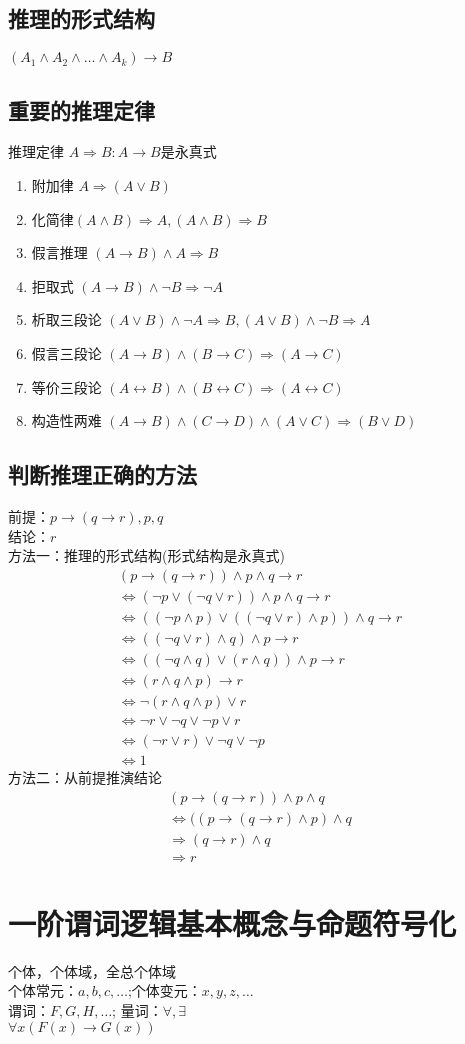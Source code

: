 \documentclass{book}
\newcommand{\Eqv}{\Leftrightarrow}
\newcommand{\eqv}{\leftrightarrow}
\newcommand{\To}{\Rightarrow}
\newcommand{\A}{\forall}
\newcommand{\E}{\exists}
\begin{document}
\subsection{推理的形式结构}
$(A_1\land A_2\land\dots\land A_k)\to B$
\subsection{重要的推理定律}
推理定律 $A\To B:A\to B$是永真式
\begin{enumerate}
\item 附加律 $A\To (A\lor B)$
\item 化简律$(A\land B)\To A, (A\land B)\To B$
\item 假言推理 $(A\to B)\land A\To B$
\item 拒取式 $(A\to B)\land \neg B\To \neg A$
\item 析取三段论 $(A\lor B)\land \neg A\To B, (A\lor B)\land \neg B\To A$
\item 假言三段论 $(A\to B)\land (B\to C)\To (A\to C)$
\item 等价三段论 $(A\eqv B)\land (B\eqv C)\To (A\eqv C)$
\item 构造性两难 $(A\to B)\land (C\to D)\land (A\lor C)\To (B\lor D)$
\end{enumerate}
\subsection{判断推理正确的方法}
前提：$p\to (q\to r), p, q$\\
结论：$r$\\
方法一：推理的形式结构(形式结构是永真式)\\
\begin{align*}
(p\to (q\to r))\land p \land q\to r\\
\Eqv (\neg p\lor (\neg q\lor r))\land p\land q\to r\\
\Eqv ((\neg p \land p)\lor ((\neg q\lor r)\land p))\land q\to r\\
\Eqv ((\neg q\lor r)\land q)\land p\to r\\
\Eqv ((\neg q\land q)\lor (r\land q))\land p\to r\\
\Eqv (r\land q\land p)\to r\\
\Eqv \neg (r\land q\land p)\lor r\\
\Eqv \neg r\lor \neg q\lor \neg p\lor r\\
\Eqv (\neg r\lor r)\lor \neg q\lor\neg p\\
\Eqv 1
\end{align*}
方法二：从前提推演结论\\
\begin{align*}
(p\to (q\to r))\land p\land q\\
\Eqv ((p\to (q\to r)\land p)\land q\\
\To (q\to r)\land q\\
\To r
\end{align*}
\section{一阶谓词逻辑基本概念与命题符号化}
个体，个体域，全总个体域\\
个体常元：$a,b,c,\dots$;个体变元：$x,y,z,\dots$\\
谓词：$F,G,H,\dots$; 量词：$\A, \E$\\
$\A x(F(x)\to G(x))$
\end{document}
